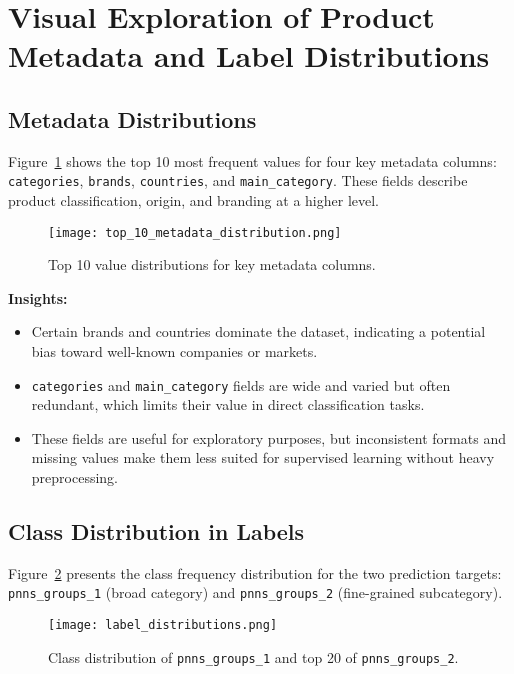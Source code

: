 \documentclass[11pt]{article}
\begin{document}
\section{Visual Exploration of Product Metadata and Label Distributions}

\subsection{Metadata Distributions}

Figure~\ref{fig:metadata_dist} shows the top 10 most frequent values for four key metadata columns: \texttt{categories}, \texttt{brands}, \texttt{countries}, and \texttt{main\_category}. These fields describe product classification, origin, and branding at a higher level.

\begin{figure}[h!]
    \centering
    \texttt{[image: top\_10\_metadata\_distribution.png]}
    \caption{Top 10 value distributions for key metadata columns.}
    \label{fig:metadata_dist}
\end{figure}

\textbf{Insights:}
\begin{itemize}
    \item Certain brands and countries dominate the dataset, indicating a potential bias toward well-known companies or markets.
    \item \texttt{categories} and \texttt{main\_category} fields are wide and varied but often redundant, which limits their value in direct classification tasks.
    \item These fields are useful for exploratory purposes, but inconsistent formats and missing values make them less suited for supervised learning without heavy preprocessing.
\end{itemize}

\subsection{Class Distribution in Labels}

Figure~\ref{fig:label_dist} presents the class frequency distribution for the two prediction targets: \texttt{pnns\_groups\_1} (broad category) and \texttt{pnns\_groups\_2} (fine-grained subcategory).

\begin{figure}[h!]
    \centering
    \texttt{[image: label\_distributions.png]}
    \caption{Class distribution of \texttt{pnns\_groups\_1} and top 20 of \texttt{pnns\_groups\_2}.}
    \label{fig:label_dist}
\end{figure}
\end{document}
